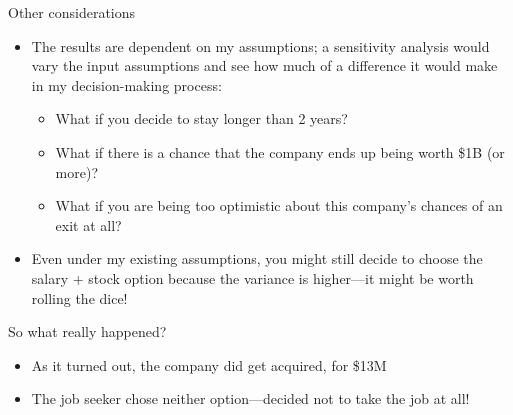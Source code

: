 \documentclass{beamer}\usepackage[]{graphicx}\usepackage[]{color}
\begin{document}
\begin{darkframes}
  \begin{frame}{Other considerations}
    \begin{itemize}[<+->]
      \item The results are dependent on my assumptions; a \alert{sensitivity analysis} would vary the input assumptions and see how much of a difference it would make in my decision-making process:
      \begin{itemize}
        \item What if you decide to stay longer than 2 years?
        \item What if there is a chance that the company ends up being worth \$1B (or more)?
        \item What if you are being too optimistic about this company's chances of an exit at all?
      \end{itemize}
      \item Even under my existing assumptions, you might still decide to choose the salary + stock option because the variance is higher---it might be worth rolling the dice!
    \end{itemize}
  \end{frame}

  \begin{frame}{So what really happened?}
    \begin{itemize}
      \item As it turned out, the company did get acquired, for \$13M
      \item The job seeker chose neither option---decided not to take the job at all!
    \end{itemize}
  \end{frame}
\end{darkframes}
\end{document}
